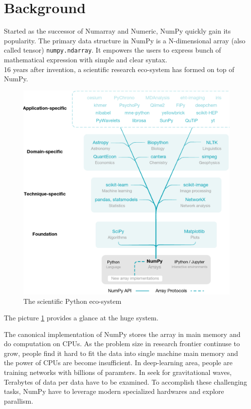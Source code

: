 \documentclass{article}
\newenvironment{newSec}[1]{
	\section{#1}
	\lhead{#1}
}{ \newpage }
\begin{document}
\begin{newSec}{Background}
	Started as the successor of Numarray and Numeric, NumPy\cite{NumPy} quickly gain its popularity.
	The primary data structure in NumPy is a N-dimensional array (also called tensor) \texttt{numpy.ndarray}.
	It empowers the users to express bunch of mathematical expression with simple and clear syntax.\\
	16 years after invention, a scientific research eco-system has formed on top of NumPy.
	\begin{figure}[htbp]
		\centering
		\includegraphics[scale=0.7]{fig/scipy-eco.png}
		\caption{The scientific Python eco-system}
		\label{fig:scipy}
	\end{figure}
	The picture \ref{fig:scipy} provides a glance at the huge system.\par

	The canonical implementation of NumPy stores the array in main memory and do computation on CPUs.
	As the problem size in research frontier continuse to grow, people find it hard
	to fit the data into single machine main memory and the power of CPUs are become insufficient.
	In deep-learning area, people are training networks with billions of paramters\cite{gpt3}.
	In seek for gravitational waves, Terabytes of data per data have to be examined\cite{gravwave}.
	To accomplish these challenging tasks, NumPy have to leverage modern specialized hardwares and explore parallism.
\end{newSec}
\end{document}
